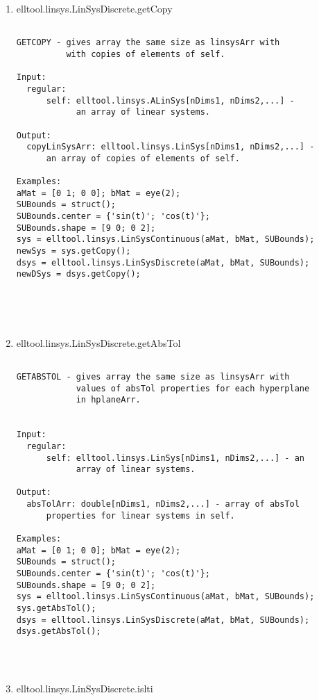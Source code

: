 \begin{enumerate}
\begin{lstlisting}
\end{lstlisting}
\fontfamily{\familydefault}
\selectfont
\item {elltool.linsys.LinSysDiscrete.getCopy}
\selectfont
\begin{lstlisting}

GETCOPY - gives array the same size as linsysArr with
          with copies of elements of self.

Input:
  regular:
      self: elltool.linsys.ALinSys[nDims1, nDims2,...] -
            an array of linear systems.

Output:
  copyLinSysArr: elltool.linsys.LinSys[nDims1, nDims2,...] -
      an array of copies of elements of self.

Examples:
aMat = [0 1; 0 0]; bMat = eye(2);
SUBounds = struct();
SUBounds.center = {'sin(t)'; 'cos(t)'};
SUBounds.shape = [9 0; 0 2];
sys = elltool.linsys.LinSysContinuous(aMat, bMat, SUBounds);
newSys = sys.getCopy();
dsys = elltool.linsys.LinSysDiscrete(aMat, bMat, SUBounds);
newDSys = dsys.getCopy();





\end{lstlisting}
\fontfamily{\familydefault}
\selectfont
\item {elltool.linsys.LinSysDiscrete.getAbsTol}
\selectfont
\begin{lstlisting}

GETABSTOL - gives array the same size as linsysArr with
            values of absTol properties for each hyperplane
            in hplaneArr.


Input:
  regular:
      self: elltool.linsys.LinSys[nDims1, nDims2,...] - an
            array of linear systems.

Output:
  absTolArr: double[nDims1, nDims2,...] - array of absTol
      properties for linear systems in self.

Examples:
aMat = [0 1; 0 0]; bMat = eye(2);
SUBounds = struct();
SUBounds.center = {'sin(t)'; 'cos(t)'};
SUBounds.shape = [9 0; 0 2];
sys = elltool.linsys.LinSysContinuous(aMat, bMat, SUBounds);
sys.getAbsTol();
dsys = elltool.linsys.LinSysDiscrete(aMat, bMat, SUBounds);
dsys.getAbsTol();




\end{lstlisting}
\fontfamily{\familydefault}
\selectfont
\item {elltool.linsys.LinSysDiscrete.islti}
\selectfont
\begin{lstlisting}


\end{lstlisting}
\end{enumerate}
